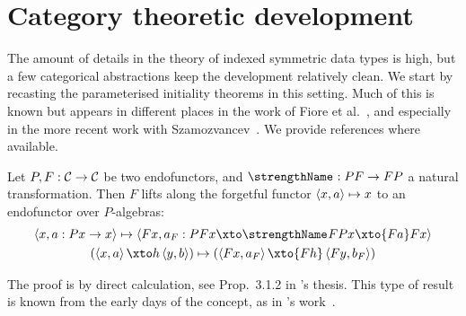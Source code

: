 \section{Category theoretic development}

The amount of details in the theory of indexed symmetric data types is
high, but a few categorical abstractions keep the development
relatively clean. We start by recasting the parameterised initiality
theorems in this setting. Much of this is known but appears in
different places in the work of Fiore et
al.~\cite{fiore-plotkin-turi:ast}, and especially in the more recent
work with
Szamozvancev~\cite{fiore-szamozvancev:formal-soas,fiore-szamozvancev:soas-theory,szamozvancev:thesis}. We
provide references where available.
\begin{lemma}
  Let $P, F : \mathcal{C}\/ \to \mathcal{C}\/$ be two endofunctors, and $\strength :
  PF \to FP$ a natural transformation. Then $F$ lifts along the
  forgetful functor $\left<{x}, {a}\right> \mapsto x$ to an endofunctor over
  $P$-algebras:
  \begin{gather*}
  \fun{\pair x{a : Px \to x}} \pair{Fx}{a_F : PFx \xto\strength FPx
    \xto{Fa} Fx}
  \\
  \fun{\parent{\pair xa \xto h \pair yb}}
  \parent{\pair{Fx}{a_F} \xto{Fh} \pair{Fy}{b_F}}
  \end{gather*}
\end{lemma}
The proof is by direct calculation, see Prop.~3.1.2 in
\citeauthor{szamozvancev:thesis}'s thesis. This type of result is
known from the early days of the concept, as in
\citeauthor{beck:distributive-laws}'s
work~\cite{beck:distributive-laws}.

